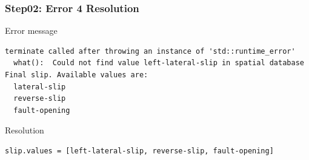 \documentclass{beamer}
\newcommand{\errlabel}[1]{{\small \color{blue}#1}}
\begin{document}
\begin{frame}[fragile]
  \frametitle{Step02: Error 4 Resolution}

\errlabel{Error message}
\begin{lstlisting}
terminate called after throwing an instance of 'std::runtime_error'
  what():  Could not find value left-lateral-slip in spatial database
Final slip. Available values are:
  lateral-slip
  reverse-slip
  fault-opening
\end{lstlisting}\pause
\errlabel{Resolution}
\begin{lstlisting}
slip.values = [left-lateral-slip, reverse-slip, fault-opening]
\end{lstlisting}

\end{frame}
\end{document}
